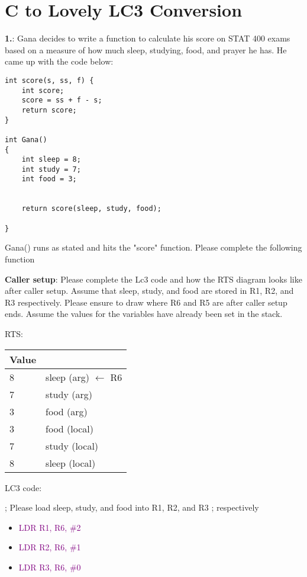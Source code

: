 \documentclass{article}
\begin{document}
\newpage
\section{C to Lovely LC3 Conversion}

\textbf{1.}: Gana decides to write a function to calculate his score on STAT 400 exams based on a measure of how much sleep, studying, food, and prayer he has. He came up with the code below:

        \begin{lstlisting}[style=CStyle]
int score(s, ss, f) {
    int score;
    score = ss + f - s;
    return score;
}

int Gana()
{
    int sleep = 8;
    int study = 7;
    int food = 3;


    return score(sleep, study, food);

} \end{lstlisting}
  Gana() runs as stated and hits the "score" function. Please complete the following function

 \textbf{Caller setup}: Please complete the Lc3 code and how the RTS diagram looks like after caller setup. Assume that sleep, study, and food are stored in R1, R2, and R3 respectively. Please ensure to draw where R6 and R5 are after caller setup ends. Assume the values for the variables have already been set in the stack.

RTS:

\begin{center}

\begin{tabular}{|p{3cm} p{3cm} |} 
\hline
 Value &   \\ [0.5ex] 
 \hline\hline
 8 & sleep (arg) $\xleftarrow{}$ R6\\ 
 \hline
 7 & study (arg)\\
 \hline
 3 & food (arg) \\
 \hline
 3 & food (local) \\
 \hline
 7 & study (local)\\ [1ex]
 \hline
  8 & sleep (local) \\ [1ex]
  \hline
 
\end{tabular}
\end{center}

      
LC3 code: 

; Please load sleep, study, and food into R1, R2, and R3 
 ; respectively 
 
 \begin{itemize}
 
    \item  \textcolor{purple}{LDR  R1, R6, \#2 }
    \item    \textcolor{purple}{LDR R2, R6, \#1 }
    \item    \textcolor{purple}{LDR R3, R6, \#0 }
    
\end{itemize}
 
\end{document}
